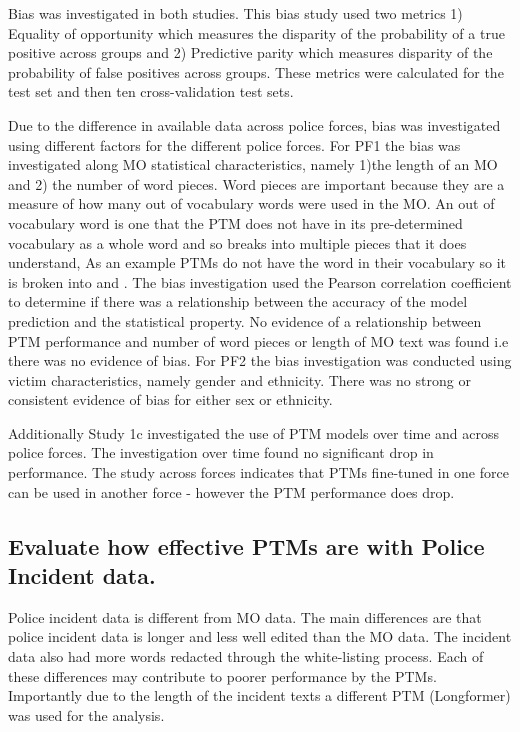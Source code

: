 Bias was investigated in both studies. This bias study used two metrics 1) Equality of opportunity which measures the disparity of the probability of a true positive across groups and 2) Predictive parity which measures disparity of the probability of false positives across groups. These metrics were calculated for the test set and then ten cross-validation test sets. 

Due to the difference in available data across police forces, bias was investigated using different factors for the different police forces. For PF1 the bias was investigated along MO statistical characteristics, namely 1)the length of an MO and 2) the number of word pieces. Word pieces are important because they are a measure of how many out of vocabulary words were used in the MO. An out of vocabulary word is one that the PTM does not have in its pre-determined vocabulary as a whole word and so breaks into multiple pieces that it does understand, As an example PTMs do not have the word   in their vocabulary so it is broken into  and . The bias investigation used the Pearson correlation coefficient to determine if there was a relationship between the accuracy of the model prediction and the statistical property. No evidence of a relationship between PTM performance and number of word pieces or length of MO text was found i.e there was no evidence of bias. For PF2 the bias investigation was conducted using victim characteristics, namely gender and ethnicity.  There was no strong or consistent evidence of bias for either sex or ethnicity.

Additionally Study 1c investigated the use of PTM models over time and across police forces. The investigation over time found no significant drop in performance. The study across forces indicates that PTMs fine-tuned in one force can be used in another force - however the PTM performance does drop. 
 
 
\subsection{Evaluate how effective PTMs are with Police Incident data.} Police incident data is different from MO data. The main differences are that police incident data is longer and less well edited than the MO data. The incident data also had more words redacted through the white-listing process. Each of these differences may contribute to poorer performance by the PTMs. Importantly due to the length of the incident texts a different PTM (Longformer) was used for the analysis.

